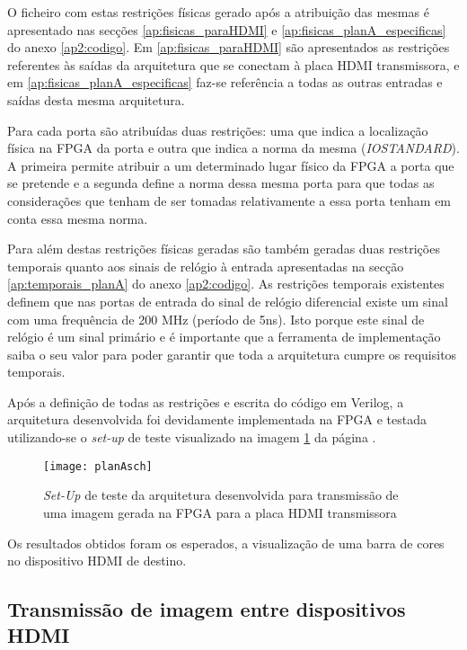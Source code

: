 O ficheiro com estas restrições físicas gerado após a atribuição das mesmas é apresentado nas secções \ref{ap:fisicas_paraHDMI} e \ref{ap:fisicas_planA_especificas} do anexo \ref{ap2:codigo}. Em  \ref{ap:fisicas_paraHDMI} são apresentados as restrições referentes às saídas da arquitetura que se conectam à placa HDMI transmissora, e em \ref{ap:fisicas_planA_especificas} faz-se referência a todas as outras entradas e saídas desta mesma arquitetura.

Para cada porta são atribuídas duas restrições: uma que indica a localização física na FPGA da porta e outra que indica a norma da mesma (\textit{IOSTANDARD}). A primeira permite atribuir a um determinado lugar físico da FPGA a porta que se pretende e a segunda define a norma dessa mesma porta para que todas as considerações que tenham de ser tomadas relativamente a essa porta tenham em conta essa mesma norma.

Para além destas restrições físicas geradas são também geradas duas restrições temporais quanto aos sinais de relógio à entrada apresentadas na secção \ref{ap:temporais_planA} do anexo \ref{ap2:codigo}. As restrições temporais existentes definem que nas portas de entrada do sinal de relógio diferencial existe um sinal com uma frequência de 200 MHz (período de 5ns). Isto porque este sinal de relógio é um sinal primário e é importante que a ferramenta de implementação saiba o seu valor para poder garantir que toda a arquitetura cumpre os requisitos temporais.

Após a definição de todas as restrições e escrita do código em Verilog, a arquitetura desenvolvida foi devidamente implementada na FPGA e testada utilizando-se o \textit{set-up} de teste visualizado na imagem \ref{fig:planA_sch} da página \pageref{fig:planA_sch}.

\begin{figure}[h!]
	\begin{center}
		\leavevmode
		\texttt{[image: planAsch]}
		\caption{\textit{Set-Up} de teste da arquitetura desenvolvida para transmissão de uma imagem gerada na FPGA para a placa HDMI transmissora}
		\label{fig:planA_sch}
	\end{center}
\end{figure}

Os resultados obtidos foram os esperados, a visualização de uma barra de cores no dispositivo HDMI de destino.

\subsection{Transmissão de imagem entre dispositivos HDMI} \label{subsub:planB}

